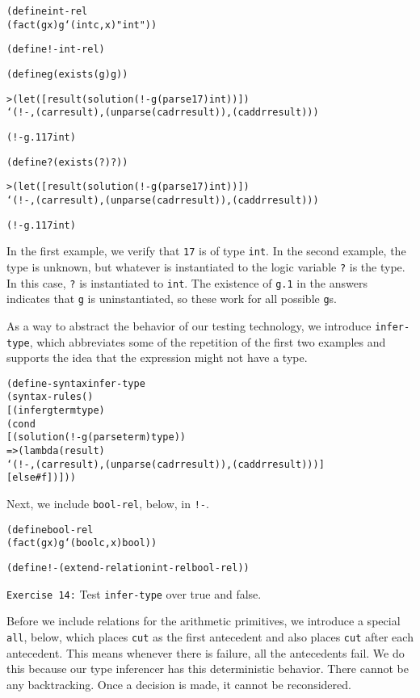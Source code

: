 \begin{alltt}
(define int-rel
  (fact (g x) g `(intc ,x) "int"))

(define !- int-rel)
\end{alltt}

\begin{alltt}
(define g (exists (g) g))

> (let ([result (solution (!- g (parse 17) int))])
    `(!- ,(car result) ,(unparse (cadr result)) ,(caddr result)))

(!- g.1 17 int)
\end{alltt}
\newpage
\begin{alltt}
(define ? (exists (?) ?))

> (let ([result (solution (!- g (parse 17) int))])
    `(!- ,(car result) ,(unparse (cadr result)) ,(caddr result)))

(!- g.1 17 int)
\end{alltt}

In the first example, we verify that \texttt{17} is of type
\texttt{int}.  In the second example, the type is unknown, but
whatever is instantiated to the logic variable \texttt{?} is the
type.  In this case, \texttt{?} is instantiated to \texttt{int}.
The existence of \texttt{g.1} in the answers indicates that \texttt{g}
is uninstantiated, so these work for all possible \texttt{g}s.

As a way to abstract the behavior of our testing technology, we
introduce \texttt{infer-type}, which abbreviates some of the
repetition of the first two examples and supports the idea that
the expression might not have a type.

\begin{alltt}
(define-syntax infer-type
  (syntax-rules ()
    [(infer g term type)
     (cond
       [(solution (!- g (parse term) type))
        => (lambda (result)
             `(!- ,(car result) ,(unparse (cadr result)) ,(caddr result)))]
       [else #f])]))
\end{alltt}

Next, we include \texttt{bool-rel}, below, in \texttt{!-}.
\begin{alltt}
(define bool-rel
  (fact (g x) g `(boolc ,x) bool))

(define !- (extend-relation int-rel bool-rel))
\end{alltt}

\texttt{Exercise 14:} Test \texttt{infer-type} over true and false.

Before we include relations for the arithmetic primitives, we
introduce a special \texttt{all}, below, which places \texttt{cut} as
the first antecedent and also places \texttt{cut} after each
antecedent.  This means whenever there is failure, all the antecedents
fail.  We do this because our type inferencer has this deterministic
behavior.  There cannot be any backtracking.  Once a decision is made,
it cannot be reconsidered.


